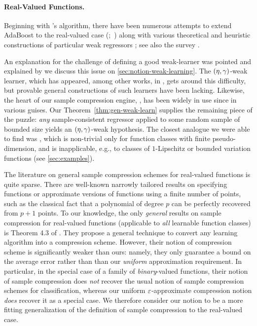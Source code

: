 \documentclass[12pt,a4paper,oneside,onecolumn]{book}
\begin{document}
\paragraph{Real-Valued Functions.}
\begin{sloppypar}
Beginning with \citet{FreundSchapire97}'s 
algorithm, there have been numerous attempts to extend
AdaBoost to the real-valued case
(\citet*{bertoni1997boosting,Drucker:1997:IRU:645526.657132,avnimelech1999boosting};\ \citet*{Karakoulas00,DuffyHelmbold02,kegl2003robust,NOCK200725})
along with various theoretical and heuristic
constructions of particular weak regressors
\citep{Mason1999,MR1873328,DBLP:journals/ml/MannorM02};
see also the survey \citet{Mendes-Moreira2012}.
\end{sloppypar}

An explanation for the challenge
of defining a good weak-learner was pointed and explained by 
\citet[Remark 2.1]{DuffyHelmbold02}
we discuss this issue on \ref{sec:notion-weak-learning}.
The $(\eta,\gamma)$-weak learner,
which has appeared, among other works, in
\citet{DBLP:journals/cpc/AnthonyBIS96,DBLP:journals/siamcomp/Simon97,avnimelech1999boosting,kegl2003robust},
gets around this difficulty,
but provable general constructions of such learners have been lacking.
Likewise, the heart of our sample compression engine, ,
has been widely in use since \citet{FreundSchapire97} in various guises.
Our Theorem~\ref{thm:gen-weak-learn}
supplies the remaining piece of the puzzle:
{\em any}
sample-consistent regressor applied to some random sample of bounded size
yields
an $(\eta,\gamma)$-weak hypothesis.
The closest analogue we were able to find was
\citet[Theorem 3]{DBLP:journals/cpc/AnthonyBIS96},
which is non-trivial only for function classes with finite pseudo-dimension,
and is inapplicable, e.g., to classes of $1$-Lipschitz or bounded variation functions
(see \ref{sec:examples}).

The literature on general sample compression schemes for real-valued functions is quite sparse. 
There are
well-known
narrowly tailored
results on specifying functions or approximate versions of functions 
using a finite number of points, such as the
classical
fact that a polynomial of degree $p$ can be perfectly 
recovered from $p+1$ points.
To our knowledge, the only \emph{general} results on sample compression for real-valued functions
(applicable to \emph{all} learnable function classes) is Theorem 4.3 of \citet*{david2016supervised}.
They propose a general technique to convert any learning algorithm into a compression scheme.  However, their notion of compression scheme is significantly weaker 
than ours: namely, they only guarantee a bound on the average error
rather than  than our \emph{uniform} approximation requirement.
In particular, in the special case of a family of \emph{binary}-valued functions, their notion of 
sample compression does \emph{not} recover the usual notion of sample compression schemes for classification, 
whereas our uniform $\varepsilon$-approximate compression notion \emph{does} recover it as a special case.  We therefore 
consider our notion to be a more
fitting
generalization of the definition of sample compression 
to the real-valued case.
\end{document}
